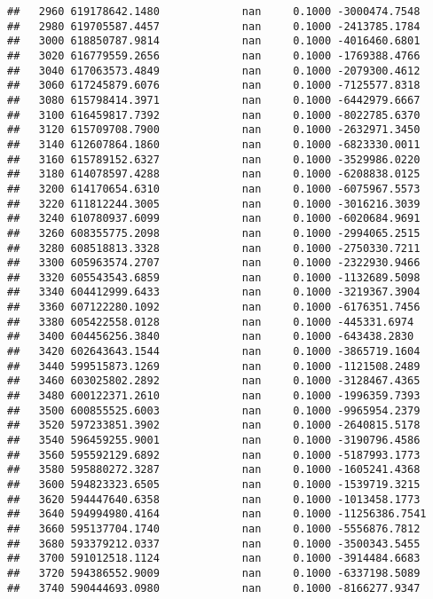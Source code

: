 \documentclass[
]{article}
\begin{document}
\begin{verbatim}
##   2960 619178642.1480             nan     0.1000 -3000474.7548
##   2980 619705587.4457             nan     0.1000 -2413785.1784
##   3000 618850787.9814             nan     0.1000 -4016460.6801
##   3020 616779559.2656             nan     0.1000 -1769388.4766
##   3040 617063573.4849             nan     0.1000 -2079300.4612
##   3060 617245879.6076             nan     0.1000 -7125577.8318
##   3080 615798414.3971             nan     0.1000 -6442979.6667
##   3100 616459817.7392             nan     0.1000 -8022785.6370
##   3120 615709708.7900             nan     0.1000 -2632971.3450
##   3140 612607864.1860             nan     0.1000 -6823330.0011
##   3160 615789152.6327             nan     0.1000 -3529986.0220
##   3180 614078597.4288             nan     0.1000 -6208838.0125
##   3200 614170654.6310             nan     0.1000 -6075967.5573
##   3220 611812244.3005             nan     0.1000 -3016216.3039
##   3240 610780937.6099             nan     0.1000 -6020684.9691
##   3260 608355775.2098             nan     0.1000 -2994065.2515
##   3280 608518813.3328             nan     0.1000 -2750330.7211
##   3300 605963574.2707             nan     0.1000 -2322930.9466
##   3320 605543543.6859             nan     0.1000 -1132689.5098
##   3340 604412999.6433             nan     0.1000 -3219367.3904
##   3360 607122280.1092             nan     0.1000 -6176351.7456
##   3380 605422558.0128             nan     0.1000 -445331.6974
##   3400 604456256.3840             nan     0.1000 -643438.2830
##   3420 602643643.1544             nan     0.1000 -3865719.1604
##   3440 599515873.1269             nan     0.1000 -1121508.2489
##   3460 603025802.2892             nan     0.1000 -3128467.4365
##   3480 600122371.2610             nan     0.1000 -1996359.7393
##   3500 600855525.6003             nan     0.1000 -9965954.2379
##   3520 597233851.3902             nan     0.1000 -2640815.5178
##   3540 596459255.9001             nan     0.1000 -3190796.4586
##   3560 595592129.6892             nan     0.1000 -5187993.1773
##   3580 595880272.3287             nan     0.1000 -1605241.4368
##   3600 594823323.6505             nan     0.1000 -1539719.3215
##   3620 594447640.6358             nan     0.1000 -1013458.1773
##   3640 594994980.4164             nan     0.1000 -11256386.7541
##   3660 595137704.1740             nan     0.1000 -5556876.7812
##   3680 593379212.0337             nan     0.1000 -3500343.5455
##   3700 591012518.1124             nan     0.1000 -3914484.6683
##   3720 594386552.9009             nan     0.1000 -6337198.5089
##   3740 590444693.0980             nan     0.1000 -8166277.9347

\end{verbatim}
\end{document}
